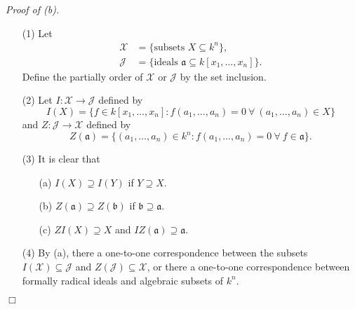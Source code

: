 \documentclass{article}
\begin{document}
\emph{Proof of (b).}
\begin{enumerate}
  \item[(1)]
  Let
  \begin{align*}
    \mathcal{X} &= \{ \text{subsets } X \subseteq k^n \}, \\
    \mathcal{J} &= \{ \text{ideals } \mathfrak{a} \subseteq k[x_1,\ldots,x_n] \}.
  \end{align*}
  Define the partially order of $\mathcal{X}$ or $\mathcal{J}$ by the set inclusion.
  \item[(2)]
  Let $I: \mathcal{X} \to \mathcal{J}$ defined by
  \[
    I(X)
    = \{ f \in k[x_1,\ldots,x_n] : f(a_1,\ldots,a_n) = 0
      \: \forall \: (a_1, \ldots, a_n) \in X \}
  \]
  and $Z: \mathcal{J} \to \mathcal{X}$ defined by
  \[
    Z(\mathfrak{a})
    = \{(a_1, \ldots, a_n) \in k^n : f(a_1,\ldots,a_n) = 0
      \: \forall \: f \in \mathfrak{a} \}.
  \]
  \item[(3)]
  It is clear that
    \begin{enumerate}
    \item[(a)]
      $I(X) \supseteq I(Y)$ if $Y \supseteq X$.
    \item[(b)]
      $Z(\mathfrak{a}) \supseteq Z(\mathfrak{b})$ if $\mathfrak{b} \supseteq \mathfrak{a}$.
    \item[(c)]
      $ZI(X) \supseteq X$ and $IZ(\mathfrak{a}) \supseteq \mathfrak{a}$.
    \end{enumerate}
  \item[(4)]
  By (a),
  there a one-to-one correspondence between
  the subsets $I(\mathcal{X}) \subseteq \mathcal{J}$ and $Z(\mathcal{J}) \subseteq \mathcal{X}$,
  or there a one-to-one correspondence between
  formally radical ideals and algebraic subsets of $k^n$.
\end{enumerate}
$\Box$ \\\\



\end{document}
